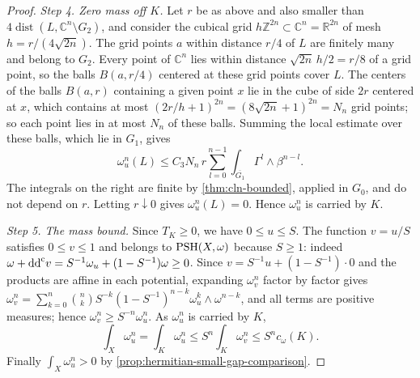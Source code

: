 \begin{proof}
\emph{Step 4. Zero mass off $K$.} Let $r$ be as above and also smaller than $4\operatorname{dist}(L,\mathbb C^n\setminus G_2)$, and consider the cubical grid $h\mathbb Z^{2n}\subset\mathbb C^n=\mathbb R^{2n}$ of mesh $h=r/(4\sqrt{2n})$. The grid points $a$ within distance $r/4$ of $L$ are finitely many and belong to $G_2$. Every point of $\mathbb C^n$ lies within distance $\sqrt{2n}\,h/2=r/8$ of a grid point, so the balls $B(a,r/4)$ centered at these grid points cover $L$. The centers of the balls $B(a,r)$ containing a given point $x$ lie in the cube of side $2r$ centered at $x$, which contains at most $(2r/h+1)^{2n}=(8\sqrt{2n}+1)^{2n}=N_n$ grid points; so each point lies in at most $N_n$ of these balls. Summing the local estimate over these balls, which lie in $G_1$, gives
\[
 \omega_u^n(L)\leq C_3N_n\,r\sum_{l=0}^{n-1}\int_{\overline{G_1}}\Gamma^l\wedge\beta^{n-l}.
\]
The integrals on the right are finite by \cref{thm:cln-bounded}, applied in $G_0$, and do not depend on $r$. Letting $r\downarrow0$ gives $\omega_u^n(L)=0$. Hence $\omega_u^n$ is carried by $K$.

\emph{Step 5. The mass bound.} Since $T_K\geq0$, we have $0\leq u\leq S$. The function $v=u/S$ satisfies $0\leq v\leq1$ and belongs to $\mathrm{PSH}(X,\omega)$ because $S\geq1$: indeed $\omega+\mathrm{dd}^{\mathrm{c}} v=S^{-1}\omega_u+(1-S^{-1})\omega\geq0$. Since $v=S^{-1}u+(1-S^{-1})\cdot0$ and the products are affine in each potential, expanding $\omega_v^n$ factor by factor gives $\omega_v^n=\sum_{k=0}^n\binom nkS^{-k}(1-S^{-1})^{n-k}\omega_u^k\wedge\omega^{n-k}$, and all terms are positive measures; hence $\omega_v^n\geq S^{-n}\omega_u^n$. As $\omega_u^n$ is carried by $K$,
\[
 \int_X\omega_u^n=\int_K\omega_u^n\leq S^n\int_K\omega_v^n\leq S^nc_\omega(K).
\]
Finally $\int_X\omega_u^n>0$ by \cref{prop:hermitian-small-gap-comparison}.
\end{proof}

